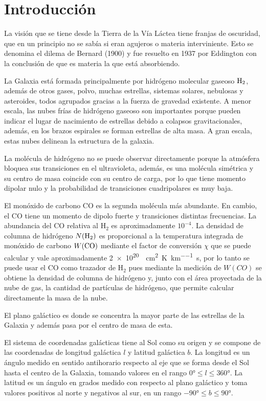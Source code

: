 \section{Introducción}

La visión que se tiene desde la Tierra de la Vía Láctea tiene franjas de oscuridad, que en un principio no se sabía si eran agujeros o materia interviniente. Esto se denomina el dilema de Bernard (1900) y fue resuelto en 1937 por Eddington con la conclusión de que es materia la que está absorbiendo.

La Galaxia está formada principalmente por hidrógeno molecular gaseoso $\textnormal{H}_2$, además de otros gases, polvo, muchas estrellas, sistemas solares, nebulosas y asteroides, todos agrupados gracias a la fuerza de gravedad existente. A menor escala, las nubes frías de hidrógeno gaseoso son importantes porque pueden indicar el lugar de nacimiento de estrellas debido a colapsos gravitacionales, además, en los brazos espirales se forman estrellas de alta masa. A gran escala, estas nubes delinean la estructura de la galaxia.

La molécula de hidrógeno no se puede observar directamente porque la atmósfera bloquea sus transiciones en el ultravioleta, además, es una molécula simétrica y su centro de masa coincide con su centro de carga, por lo que tiene momento dipolar nulo y la probabilidad de transiciones cuadripolares es muy baja.

El monóxido de carbono CO es la segunda molécula más abundante. En cambio, el CO tiene un momento de dipolo fuerte y transiciones  distintas frecuencias. La abundancia del CO relativa al H$_2$ es aproximadamente $10^{-4}$. La densidad de columna de hidrógeno $N(\textnormal{H}_2)$ es proporcional a la temperatura integrada de monóxido de carbono $W(\textnormal{CO})$ mediante el factor de conversión $\chi$ que se puede calcular y vale aproximadamente \SI{2e20}{\per\centi\metre\squared\per\kelvin\per\kilo\metre\second}, por lo tanto se puede usar el CO como trazador de H$_2$ pues mediante la medición de $W(CO)$ se obtiene la densidad de columna de hidrógeno y, junto con el área proyectada de la nube de gas, la cantidad de partículas de hidrógeno, que permite calcular directamente la masa de la nube.

El plano galáctico es donde se concentra la mayor parte de las estrellas de la Galaxia y además pasa por el centro de masa de esta.

El sistema de coordenadas galácticas tiene al Sol como su origen y se compone de las coordenadas de longitud galáctica $l$ y latitud galáctica $b$. La longitud es un ángulo medido en sentido antihorario respecto al eje que se forma desde el Sol hasta el centro de la Galaxia, tomando valores en el rango $\ang{0}\le l\le\ang{360}$. La latitud es un ángulo en grados medido con respecto al plano galáctico y toma valores positivos al norte y negativos al sur, en un rango $\ang{-90}\le b\le\ang{90}$.

